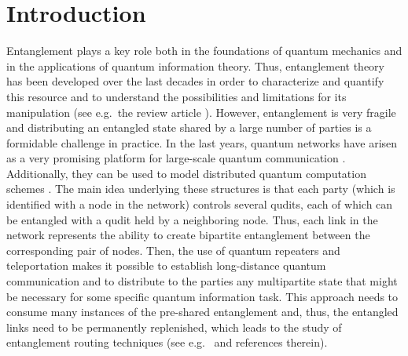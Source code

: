 \documentclass[a4paper,onecolumn,accepted=2024-12-14]{quantumarticle}
\theoremstyle{plain}
\begin{document}
\maketitle
\tableofcontents


\section{Introduction}\label{sec1}

Entanglement plays a key role both in the foundations of quantum mechanics and in the applications of quantum information theory. Thus, entanglement theory has been developed over the last decades in order to characterize and quantify this resource and to understand the possibilities and limitations for its manipulation (see e.g.\ the review article \cite{horodecki2009quantum}). However, entanglement is very fragile and distributing an entangled state shared by a large number of parties is a formidable challenge in practice. In the last years, quantum networks have arisen as a very promising platform for large-scale quantum communication \cite{wehner2018quantum}. Additionally, they can be used to model distributed quantum computation schemes \cite{distributedqc1,distributedqc2}. The main idea underlying these structures is that each party (which is identified with a node in the network) controls several qudits, each of which can be entangled with a qudit held by a neighboring node. Thus, each link in the network represents the ability to create bipartite entanglement between the corresponding pair of nodes. Then, the use of quantum repeaters and teleportation makes it possible to establish long-distance quantum communication and to distribute to the parties any multipartite state that might be necessary for some specific quantum information task. This approach needs to consume many instances of the pre-shared entanglement and, thus, the entangled links need to be permanently replenished, which leads to the study of entanglement routing techniques (see e.g.\ \cite{elkouss} and references therein).
\end{document}
